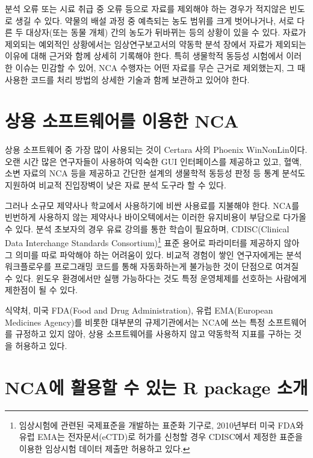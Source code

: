 \documentclass[
  11pt,
  krantz2, a4paper, twoside]{krantz}
\theoremstyle{definition}
\theoremstyle{definition}
\theoremstyle{definition}
\theoremstyle{definition}
\theoremstyle{remark}
\begin{document}
분석 오류 또는 시료 취급 중 오류 등으로 자료를 제외해야 하는 경우가 적지않은 빈도로 생길 수 있다. 약물의 배설 과정 중 예측되는 농도 범위를 크게 벗어나거나, 서로 다른 두 대상자(또는 동물 개체) 간의 농도가 뒤바뀌는 등의 상황이 있을 수 있다. 자료가 제외되는 예외적인 상황에서는 임상연구보고서의 약동학 분석 장에서 자료가 제외되는 이유에 대해 근거와 함께 상세히 기록해야 한다. 특히 생물학적 동등성 시험에서 이러한 이슈는 민감할 수 있어, NCA 수행자는 어떤 자료를 무슨 근거로 제외했는지, 그 때 사용한 코드를 처리 방법의 상세한 기술과 함께 보관하고 있어야 한다. 

\hypertarget{uxc0c1uxc6a9-uxc18cuxd504uxd2b8uxc6e8uxc5b4uxb97c-uxc774uxc6a9uxd55c-nca}{%
\section{상용 소프트웨어를 이용한 NCA}\label{uxc0c1uxc6a9-uxc18cuxd504uxd2b8uxc6e8uxc5b4uxb97c-uxc774uxc6a9uxd55c-nca}}

상용 소프트웨어 중 가장 많이 사용되는 것이 Certara 사의 Phoenix WinNonLin이다. 오랜 시간 많은 연구자들이 사용하여 익숙한 GUI 인터페이스를 제공하고 있고, 혈액, 소변 자료의 NCA 등을 제공하고 간단한 설계의 생물학적 동등성 판정 등 통계 분석도 지원하여 비교적 진입장벽이 낮은 자료 분석 도구라 할 수 있다. 

그러나 소규모 제약사나 학교에서 사용하기에 비싼 사용료를 지불해야 한다. NCA를 빈번하게 사용하지 않는 제약사나 바이오텍에서는 이러한 유지비용이 부담으로 다가올 수 있다.
분석 초보자의 경우 유료 강의를 통한 학습이 필요하며, CDISC(Clinical Data Interchange Standards Consortium)\footnote{임상시험에 관련된 국제표준을 개발하는 표준화 기구로, 2010년부터 미국 FDA와 유럽 EMA는 전자문서(eCTD)로 허가를 신청할 경우 CDISC에서 제정한 표준을 이용한 임상시험 데이터 제출만 허용하고 있다.} 표준 용어로 파라미터를 제공하지 않아 그 의미를 따로 파악해야 하는 어려움이 있다.
비교적 경험이 쌓인 연구자에게는 분석 워크플로우를 프로그래밍 코드를 통해 자동화하는게 불가능한 것이 단점으로 여겨질 수 있다.
윈도우 환경에서만 실행 가능하다는 것도 특정 운영체제를 선호하는 사람에게 제한점이 될 수 있다.

식약처, 미국 FDA(Food and Drug Administration), 유럽 EMA(European Medicines Agency)를 비롯한 대부분의 규제기관에서는 NCA에 쓰는 특정 소프트웨어를 규정하고 있지 않아, 상용 소프트웨어를 사용하지 않고 약동학적 지표를 구하는 것을 허용하고 있다.

\hypertarget{ncauxc5d0-uxd65cuxc6a9uxd560-uxc218-uxc788uxb294-r-package-uxc18cuxac1c}{%
\section{NCA에 활용할 수 있는 R package 소개}\label{ncauxc5d0-uxd65cuxc6a9uxd560-uxc218-uxc788uxb294-r-package-uxc18cuxac1c}}
\end{document}
